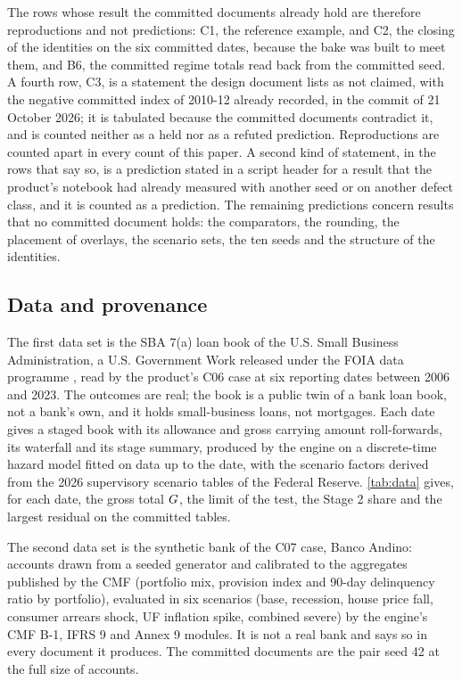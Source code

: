 The rows whose result the committed documents already hold are therefore reproductions and not predictions: C1, the reference example, and C2, the closing of the identities on the six committed dates, because the bake was built to meet them, and B6, the committed regime totals read back from the committed seed.
A fourth row, C3, is a statement the design document lists as not claimed, with the negative committed index of 2010-12 already recorded, in the commit of 21 October 2026; it is tabulated because the committed documents contradict it, and is counted neither as a held nor as a refuted prediction.
Reproductions are counted apart in every count of this paper.
A second kind of statement, in the rows that say so, is a prediction stated in a script header for a result that the product's notebook had already measured with another seed or on another defect class, and it is counted as a prediction.
The remaining predictions concern results that no committed document holds: the comparators, the rounding, the placement of overlays, the scenario sets, the ten seeds and the structure of the identities.



\subsection{Data and provenance}
\label{sec:design-data}

The first data set is the SBA 7(a) loan book of the U.S. Small Business Administration, a U.S. Government Work released under the FOIA data programme \citep{sba7a}, read by the product's C06 case at six reporting dates between 2006 and 2023.
The outcomes are real; the book is a public twin of a bank loan book, not a bank's own, and it holds small-business loans, not mortgages.
Each date gives a staged book with its allowance and gross carrying amount roll-forwards, its waterfall and its stage summary, produced by the engine on a discrete-time hazard model fitted on data up to the date, with the scenario factors derived from the 2026 supervisory scenario tables of the Federal Reserve.
\cref{tab:data} gives, for each date, the gross total $G$, the limit of the test, the Stage 2 share and the largest residual on the committed tables.

The second data set is the synthetic bank of the C07 case, Banco Andino: accounts drawn from a seeded generator and calibrated to the aggregates published by the CMF (portfolio mix, provision index and 90-day delinquency ratio by portfolio), evaluated in six scenarios (base, recession, house price fall, consumer arrears shock, UF inflation spike, combined severe) by the engine's CMF B-1, IFRS 9 and Annex 9 modules.
It is not a real bank and says so in every document it produces.
The committed documents are the pair seed 42 at the full size of \efiveAccounts{} accounts.

